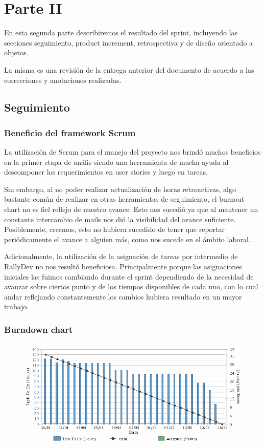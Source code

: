 \section{Parte II}

En esta segunda parte describiremos el resultado del sprint, incluyendo las secciones seguimiento, product increment, retrospectiva y de diseño orientado a objetos.
 
La misma es una revisi\'on de la entrega anterior del documento de acuerdo a las correcciones y anotaciones realizadas.


\subsection{Seguimiento}
\subsubsection{Beneficio del framework Scrum}

La utilizaci\'on de Scrum para el manejo del proyecto nos brindó muchos beneficios en la primer etapa de an\'alis siendo una herramienta de mucha ayuda al descomponer los requerimientos en user stories y luego en tareas. 

Sin embargo, al no poder realizar actualización de horas retroactivas, algo bastante común de realizar en otras herramientas de seguimiento, el burnout chart no es fiel reflejo de nuestro avance. Esto nos sucedió ya que al mantener un constante intercambio de mails nos di\'o la visibilidad del avance suficiente. Posiblemente, creemos, esto no hubiera sucedido de tener que reportar periódicamente el avance a alguien más, como nos sucede en el ámbito laboral. 

Adicionalmente, la utilización de la asignaci\'on de tareas por intermedio de RallyDev no nos result\'o beneficiosa. Principalmente porque las asignaciones iniciales las fuimos cambiando durante el sprint dependiendo de la necesidad de avanzar sobre ciertos punto y de los tiempos disponibles de cada uno, con lo cual andar reflejando constantemente los cambios hubiera resultado en un mayor trabajo.

\subsubsection{Burndown chart}
\begin{figure}[ht]
\includegraphics[width=\textwidth]{./imgs/burndown.png}
\end{figure}
